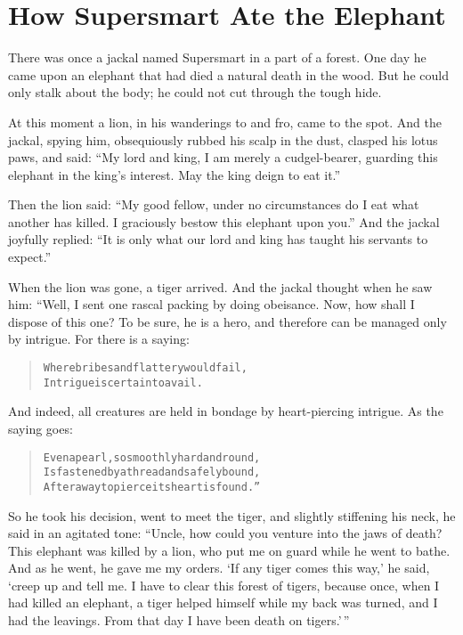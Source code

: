 \documentclass[article, twoside, 14pt]{memoir}
\renewenvironment{verbatim}{%
\begin{quote}%
\vskip -10pt%
\begin{alltt}\normalfont\large}{\end{alltt}%
\end{quote}%
\vskip -10pt
} %
\begin{document}
\chapter{How Supersmart Ate the Elephant}

\label{s76}

There was once a jackal named Supersmart in a part of a forest. One
day he came upon an elephant that had died a natural death in the
wood. But he could only stalk about the body; he could not cut
through the tough hide.

At this moment a lion, in his wanderings to and fro, came to
the spot. And the jackal, spying him, obsequiously rubbed his scalp
in the dust, clasped his lotus paws, and said:
``My lord and king, I am merely a cudgel-bearer, guarding this elephant in the king's interest. May the king deign to eat it.''

Then the lion said:
``My good fellow, under no circumstances do I eat what another has killed. I graciously bestow this elephant upon you.''
And the jackal joyfully replied:
``It is only what our lord and king has taught his servants to expect.''

When the lion was gone, a tiger arrived. And the jackal thought
when he saw him: “Well, I sent one rascal packing by doing
obeisance. Now, how shall I dispose of this one? To be sure, he is
a hero, and therefore can be managed only by intrigue. For there is
a saying:

\begin{verbatim}
Where bribes and flattery would fail,
Intrigue is certain to avail.
\end{verbatim}
And indeed, all creatures are held in bondage by heart-piercing
intrigue. As the saying goes:

\begin{verbatim}
Even a pearl, so smoothly hard and round,
Is fastened by a thread and safely bound,
After a way to pierce its heart is found.”
\end{verbatim}
So he took his decision, went to meet the tiger, and slightly
stiffening his neck, he said in an agitated tone:
``Uncle, how could you venture into the jaws of death? This elephant was killed by a lion, who put me on guard while he went to bathe. And as he went, he gave me my orders. `If any tiger comes this way,' he said, `creep up and tell me. I have to clear this forest of tigers, because once, when I had killed an elephant, a tiger helped himself while my back was turned, and I had the leavings. From that day I have been death on tigers.'\,''
\end{document}

